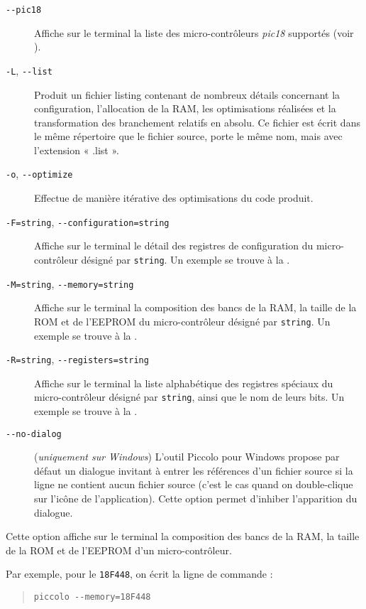 \begin{description}
  \item[\texttt{-{-}pic18}] Affiche sur le terminal la liste des micro-contrôleurs \emph{pic18} supportés (voir ).
  \item[\texttt{-L}, \texttt{-{-}list}] Produit un fichier listing contenant de nombreux détails concernant la configuration, l’allocation de la RAM, les optimisations réalisées et la transformation des branchement relatifs en absolu. Ce fichier est écrit dans le même répertoire que le fichier source, porte le même nom, mais avec l’extension « .list ».
  \item[\texttt{-o}, \texttt{-{-}optimize}] Effectue de manière itérative des optimisations du code produit.
  \item[\texttt{-F=string}, \texttt{-{-}configuration=string}] Affiche sur le terminal le détail des registres de configuration du micro-contrôleur désigné par \texttt{string}. Un exemple se trouve à la .
  \item[\texttt{-M=string}, \texttt{-{-}memory=string}] Affiche sur le terminal la composition des bancs de la RAM, la taille de la ROM et de l’EEPROM du micro-contrôleur désigné par \texttt{string}. Un exemple se trouve à la .
  \item[\texttt{-R=string}, \texttt{-{-}registers=string}] Affiche sur le terminal la liste alphabétique des registres spéciaux du micro-contrôleur désigné par \texttt{string}, ainsi que le nom de leurs bits. Un exemple se trouve à la .
  \item[\texttt{-{-}no-dialog}] (\emph{uniquement sur Windows}) L’outil Piccolo pour Windows propose par défaut un dialogue invitant à entrer les références d’un fichier source si la ligne ne contient aucun fichier source (c’est le cas quand on double-clique sur l’icône de l’application). Cette option permet d'inhiber l’apparition du dialogue.
\end{description}


Cette option affiche sur le terminal la composition des bancs de la RAM, la taille de la ROM et de l’EEPROM d'un micro-contrôleur.

Par exemple, pour le \texttt{18F448}, on écrit la ligne de commande :
\begin{quote}
  \texttt{piccolo -{}-memory=18F448}
\end{quote}

